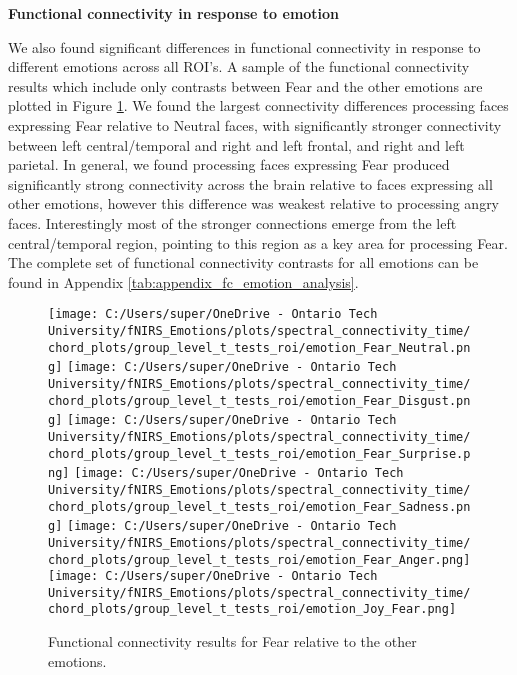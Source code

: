 \noindent
\textbf{Functional connectivity in response to emotion}

We also found significant differences in functional connectivity in response to different emotions across all ROI's. 
A sample of the functional connectivity results which include only contrasts between Fear and the other emotions are plotted in Figure \ref{fig:fc_emotion_analysis}.
We found the largest connectivity differences processing faces expressing Fear relative to Neutral faces, with significantly stronger connectivity between left central/temporal and right and left frontal, and right and left parietal. 
In general, we found processing faces expressing Fear produced significantly strong connectivity across the brain relative to faces expressing all other emotions, however this difference was weakest relative to processing angry faces. 
Interestingly most of the stronger connections emerge from the left central/temporal region, pointing to this region as a key area for processing Fear. 
The complete set of functional connectivity contrasts for all emotions can be found in Appendix \ref{tab:appendix_fc_emotion_analysis}. 

\begin{figure}[H]
  \centering
  \texttt{[image: C:/Users/super/OneDrive - Ontario Tech University/fNIRS\_Emotions/plots/spectral\_connectivity\_time/chord\_plots/group\_level\_t\_tests\_roi/emotion\_Fear\_Neutral.png]}
  \texttt{[image: C:/Users/super/OneDrive - Ontario Tech University/fNIRS\_Emotions/plots/spectral\_connectivity\_time/chord\_plots/group\_level\_t\_tests\_roi/emotion\_Fear\_Disgust.png]}
  \texttt{[image: C:/Users/super/OneDrive - Ontario Tech University/fNIRS\_Emotions/plots/spectral\_connectivity\_time/chord\_plots/group\_level\_t\_tests\_roi/emotion\_Fear\_Surprise.png]}
  \texttt{[image: C:/Users/super/OneDrive - Ontario Tech University/fNIRS\_Emotions/plots/spectral\_connectivity\_time/chord\_plots/group\_level\_t\_tests\_roi/emotion\_Fear\_Sadness.png]}
  \texttt{[image: C:/Users/super/OneDrive - Ontario Tech University/fNIRS\_Emotions/plots/spectral\_connectivity\_time/chord\_plots/group\_level\_t\_tests\_roi/emotion\_Fear\_Anger.png]}
  \texttt{[image: C:/Users/super/OneDrive - Ontario Tech University/fNIRS\_Emotions/plots/spectral\_connectivity\_time/chord\_plots/group\_level\_t\_tests\_roi/emotion\_Joy\_Fear.png]}
  \caption[FC: Emotion Contrasts (Fear)]{Functional connectivity results for Fear relative to the other emotions.}
  \label{fig:fc_emotion_analysis}
\end{figure}

